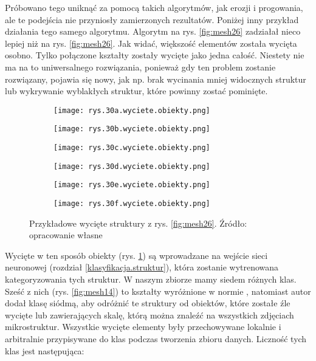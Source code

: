 Próbowano tego uniknąć za pomocą takich algorytmów, jak erozji i progowania, ale te podejścia nie przyniosły zamierzonych rezultatów. Poniżej inny przykład działania tego samego algorytmu.
Algorytm na rys. \ref{fig:mesh26} zadziałał nieco lepiej niż na rys. \ref{fig:mesh26}. Jak widać, większość elementów została wycięta osobno. Tylko połączone kształty zostały wycięte jako jedna całość. Niestety nie ma na to uniwersalnego rozwiązania, ponieważ gdy ten problem zostanie rozwiązany, pojawia się nowy, jak np. brak wycinania mniej widocznych struktur lub wykrywanie wyblakłych struktur, które powinny zostać pominięte.
\begin{figure}[h]
	\centering
	\begin{subfigure}{0.29\textwidth}
	    \centering
	    \texttt{[image: rys.30a.wyciete.obiekty.png]}
	\end{subfigure}
	\begin{subfigure}{0.29\textwidth}
	    \centering
	    \texttt{[image: rys.30b.wyciete.obiekty.png]}
	\end{subfigure}
	\begin{subfigure}{0.29\textwidth}
	    \centering
	    \texttt{[image: rys.30c.wyciete.obiekty.png]}
	\end{subfigure}
	\begin{subfigure}{0.29\textwidth}
	    \centering
	    \texttt{[image: rys.30d.wyciete.obiekty.png]}
	\end{subfigure}
	\begin{subfigure}{0.29\textwidth}
	    \centering
	    \texttt{[image: rys.30e.wyciete.obiekty.png]}
	\end{subfigure}
	\begin{subfigure}{0.29\textwidth}
	    \centering
	    \texttt{[image: rys.30f.wyciete.obiekty.png]}
	\end{subfigure}
	\caption{\label{fig:mesh28}Przykładowe wycięte struktury z rys. \ref{fig:mesh26}. Źródło: opracowanie własne}
\end{figure}
Wycięte w ten sposób obiekty (rys. \ref{fig:mesh28}) są wprowadzane na wejście sieci neuronowej (rozdział \ref{klasyfikacja.struktur}), która zostanie wytrenowana kategoryzowania tych struktur. W naszym zbiorze mamy siedem różnych klas. Sześć z nich (rys. \ref{fig:mesh14}) to kształty wyróżnione w normie \cite{norma}, natomiast autor dodał klasę siódmą, aby odróżnić te struktury od obiektów, które zostałe źle wycięte lub zawierających skalę, którą można znaleźć na wszystkich zdjęciach mikrostruktur. Wszystkie wycięte elementy były przechowywane lokalnie i arbitralnie przypisywane do klas podczas tworzenia zbioru danych. Liczność tych klas jest następująca:
